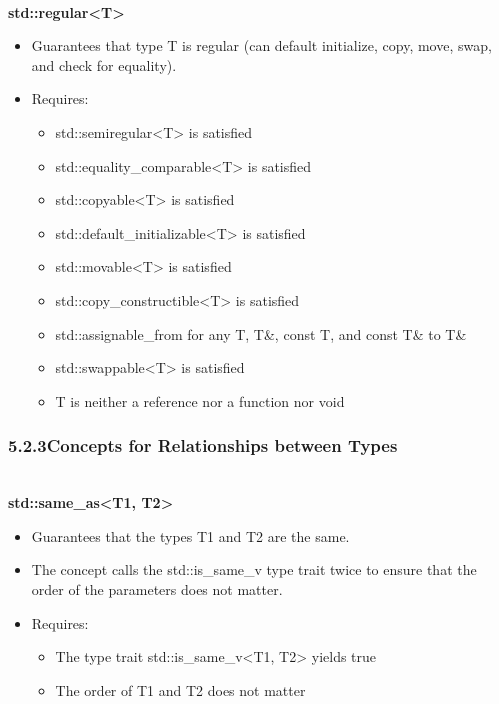 \noindent
\hspace*{\fill} \\ %
\textbf{std::regular<T>}

\begin{itemize}
\item
Guarantees that type T is regular (can default initialize, copy, move, swap, and check for equality).

\item
Requires:
\begin{itemize}
\item
std::semiregular<T> is satisfied

\item
std::equality\_comparable<T> is satisfied

\item
std::copyable<T> is satisfied

\item
std::default\_initializable<T> is satisfied

\item
std::movable<T> is satisfied

\item
std::copy\_constructible<T> is satisfied

\item
std::assignable\_from for any T, T\&, const T, and const T\& to T\&

\item
std::swappable<T> is satisfied

\item
T is neither a reference nor a function nor void
\end{itemize}
\end{itemize}

\subsubsection*{ 5.2.3\hspace{0.2cm}Concepts for Relationships between Types}

\noindent
\hspace*{\fill} \\ %
\textbf{std::same\_as<T1, T2>}

\begin{itemize}
\item
Guarantees that the types T1 and T2 are the same.

\item
The concept calls the std::is\_same\_v type trait twice to ensure that the order of the parameters does not matter.

\item
Requires:
\begin{itemize}
\item
The type trait std::is\_same\_v<T1, T2> yields true

\item
The order of T1 and T2 does not matter
\end{itemize}
\end{itemize}


